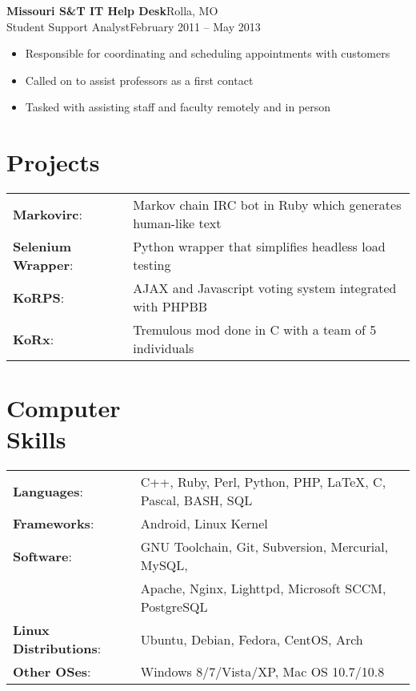 \documentclass[margin]{res}
\newcommand{\github}[0]%
{%
  \hspace{-4mm}\faGithubSign\hspace{1mm}%
}
\begin{document}
\begin{resume}
       \textbf{Missouri S\&T IT Help Desk}\hfill Rolla, MO\\
       Student Support Analyst\hfill February 2011 -- May 2013
       \begin{itemize} \itemsep -1pt  %
         \item Responsible for coordinating and scheduling appointments with customers
         \item Called on to assist professors as a first contact
         \item Tasked with assisting staff and faculty remotely and in person
       \end{itemize}

    \section{Projects} 
      \begin{tabular}{l p{4in}}
        \github\textbf{Markovirc}:            & Markov chain IRC bot in Ruby which generates human-like text \\ [1pt]
        \github\textbf{Selenium Wrapper}:     & Python wrapper that simplifies headless load testing \\ [1pt]
        \textbf{KoRPS}:                       & AJAX and Javascript voting system integrated with PHPBB \\ [1pt]
        \textbf{KoRx}:                        & Tremulous mod done in C with a team of 5 individuals \\ [1pt]
      \end{tabular}

    \section{Computer \\ Skills}
      \begin{tabular}{l p{3.6in}}
        \textbf{Languages}:                   & C++, Ruby, Perl, Python, PHP, \LaTeX, C, Pascal, BASH, SQL \\ [1pt]
        \textbf{Frameworks}:                  & Android, Linux Kernel \\ [1pt]
        \textbf{Software}:                    & GNU Toolchain, Git, Subversion, Mercurial, MySQL, \\
                                              & Apache, Nginx, Lighttpd, Microsoft SCCM, PostgreSQL \\ [1pt]
        \textbf{Linux Distributions}:         & Ubuntu, Debian, Fedora, CentOS, Arch \\ [1pt]
        \textbf{Other OSes}:                  & Windows 8/7/Vista/XP, Mac OS 10.7/10.8 \\ [1pt]
      \end{tabular}

  \end{resume} 
\end{document}
